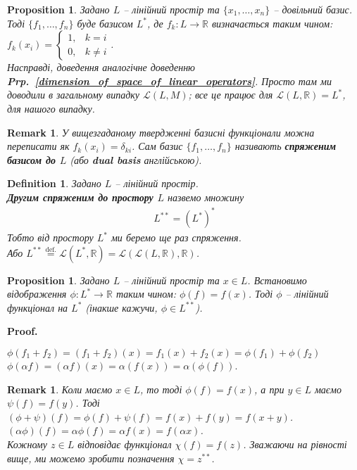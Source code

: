 \documentclass[a4paper, 10pt]{article}
\makeatletter
\theoremstyle{theoremdd}
\newtheorem{definition}[theorem]{Definition}
\newtheorem{proposition}[theorem]{Proposition}
\newtheorem{remark}[theorem]{Remark}
\newcommand\prpref[1]{\textbf{Prp.~\ref{#1}}}
\renewenvironment{proof}[1][Proof.\\]{\par
\pushQED{\hfill \qed}%
\normalfont \topsep6\p@\@plus6\p@\relax
\trivlist
\item\relax
{\bfseries
#1\@addpunct{.}}\hspace\labelsep\ignorespaces
}{%
\popQED\endtrivlist\@endpefalse
}
\makeatother
\begin{document}
\begin{proposition}
Задано $L$ -- лінійний простір та $\{x_1,\dots,x_n\}$ -- довільний базис. Тоді $\{f_1,\dots,f_n\}$ буде базисом $L^*$, де $f_k \colon L \to \mathbb{R}$ визначається таким чином: $f_k(x_i) = \begin{cases} 1, & k = i \\ 0, & k \neq i \end{cases}$.\\
\textit{Насправді, доведення аналогічне доведенню \prpref{dimension_of_space_of_linear_operators}. Просто там ми доводили в загальному випадку $\mathcal{L}(L,M)$; все це працює для $\mathcal{L}(L,\mathbb{R}) = L^*$, для нашого випадку.}
\end{proposition}

\begin{remark}
У вищезгаданому твердженні базисні функціонали можна переписати як $f_k(x_i) = \delta_{ki}$. Сам базис $\{f_1,\dots,f_n\}$ називають \textbf{спряженим базисом до $L$} (або \textbf{dual basis} англійською).
\end{remark}

\begin{definition}
Задано $L$ -- лінійний простір.\\
\textbf{Другим спряженим до простору $L$} назвемо множину
\begin{align*}
L^{**} = (L^*)^*
\end{align*}
Тобто від простору $L^*$ ми беремо ще раз спряження.\\
Або $L^{**} \overset{\text{def.}}{=} \mathcal{L}(L^*,\mathbb{R}) = \mathcal{L}(\mathcal{L}(L,\mathbb{R}),\mathbb{R})$.
\end{definition}

\begin{proposition}
Задано $L$ -- лінійний простір та $x \in L$. Встановимо відображення $\phi \colon L^* \to \mathbb{R}$ таким чином: $\phi(f) = f(x)$. Тоді $\phi$ -- лінійний функціонал на $L^*$ (інакше кажучи, $\phi \in L^{**}$).
\end{proposition}

\begin{proof}
$\phi(f_1+f_2) = (f_1+f_2)(x) = f_1(x) + f_2(x) = \phi(f_1) + \phi(f_2)$\\
$\phi(\alpha f) = (\alpha f)(x) = \alpha (f(x)) = \alpha (\phi(f))$.
\end{proof}

\begin{remark}
Коли маємо $x \in L$, то тоді $\phi(f) = f(x)$, а при $y \in L$ маємо $\psi(f) = f(y)$. Тоді\\
$(\phi+\psi)(f) = \phi(f) + \psi(f) = f(x) + f(y) = f(x+y)$.\\
$(\alpha \phi)(f) = \alpha \phi(f) = \alpha f(x) = f(\alpha x)$.\\
Кожному $z \in L$ відповідає функціонал $\chi(f) = f(z)$. Зважаючи на рівності вище, ми можемо зробити позначення $\chi = z^{**}$.
\end{remark}
\end{document}
